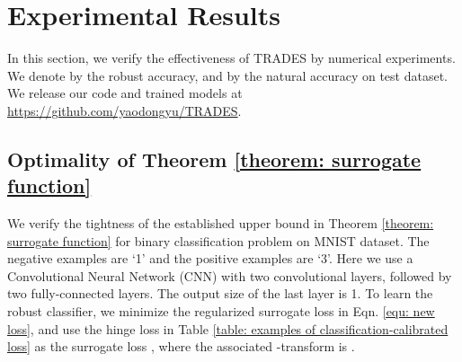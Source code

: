 \documentclass[11pt]{article}
\newtheorem{theorem}{Theorem}[section]
\newtheorem{lemma}[theorem]{Lemma}
\newcommand{\0}{\mathbf{0}}
\newcommand{\1}{\mathbf{1}}
\renewcommand{\comment}[1]{}
\begin{document}
\comment{
\section{Uniform Convergence}

\begin{lemma}[Theorem 26.5, \cite{shalev2014understanding}]
Assume that for all  and  we have that . Let  be -Lipschitz. Then with probability of at least ,

where  is the sample set with  and  is the Rademacher complexity.
\end{lemma}

Plugging this into Theorem \ref{theorem: surrogate function}, we have
\begin{theorem}
Assume that for all  and  we have that . For any non-negative loss function , any measurable , and any probability distribution on , with probability of at least ,

where the function  is defined as in \cite{bartlett2006convexity} which is independent of .
\end{theorem}
}












\vspace{-0.1cm}
\section{Experimental Results}\label{sec:experiments}
In this section, we verify the effectiveness of TRADES by numerical experiments. We denote by  the robust accuracy, and by  the natural accuracy on test dataset. We release our code and trained models at \url{https://github.com/yaodongyu/TRADES}.

\vspace{-0.2cm}
\subsection{Optimality of Theorem \ref{theorem: surrogate function}}

We verify the tightness of the established upper bound in Theorem \ref{theorem: surrogate function} for binary classification problem on MNIST dataset. The negative examples are `1' and the positive examples are `3'. Here we use a Convolutional Neural Network (CNN) with two convolutional layers, followed by two fully-connected layers. The output size of the last layer is 1. To learn the robust classifier, we minimize the regularized surrogate loss in Eqn. \eqref{equ: new loss}, and use the hinge loss in Table \ref{table: examples of classification-calibrated loss} as the surrogate loss , where the associated -transform is .
\end{document}
